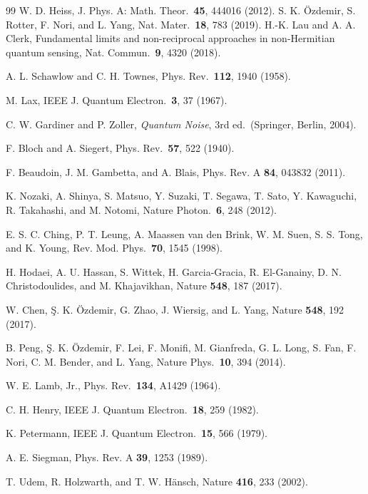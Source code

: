\documentclass[12pt]{article}
\begin{document}
\begin{thebibliography}{99}
W. D. Heiss,
J. Phys. A: Math. Theor.\ \textbf{45}, 444016 (2012).
S. K. \"{O}zdemir, S. Rotter, F. Nori, and L. Yang,
Nat. Mater.\ \textbf{18}, 783 (2019).
H.-K. Lau and A. A. Clerk,
Fundamental limits and non-reciprocal approaches in non-Hermitian quantum sensing,
Nat. Commun.\ \textbf{9}, 4320 (2018).


A. L. Schawlow and C. H. Townes,
Phys. Rev.\ \textbf{112}, 1940 (1958).

M. Lax,
IEEE J. Quantum Electron.\ \textbf{3}, 37 (1967).

C. W. Gardiner and P. Zoller,
\textit{Quantum Noise}, 3rd ed.\ (Springer, Berlin, 2004).

F. Bloch and A. Siegert,
Phys. Rev.\ \textbf{57}, 522 (1940).

F. Beaudoin, J. M. Gambetta, and A. Blais,
Phys. Rev. A \textbf{84}, 043832 (2011).

K. Nozaki, A. Shinya, S. Matsuo, Y. Suzaki, T. Segawa, T. Sato,
Y. Kawaguchi, R. Takahashi, and M. Notomi,
Nature Photon.\ \textbf{6}, 248 (2012).

E. S. C. Ching, P. T. Leung, A. Maassen van den Brink, W. M. Suen,
S. S. Tong, and K. Young,
Rev. Mod. Phys.\ \textbf{70}, 1545 (1998).

H. Hodaei, A. U. Hassan, S. Wittek, H. Garcia-Gracia, R. El-Ganainy,
D. N. Christodoulides, and M. Khajavikhan,
Nature \textbf{548}, 187 (2017).

W. Chen, \c{S}. K. \"{O}zdemir, G. Zhao, J. Wiersig, and L. Yang,
Nature \textbf{548}, 192 (2017).

B. Peng, \c{S}. K. \"{O}zdemir, F. Lei, F. Monifi, M. Gianfreda,
G. L. Long, S. Fan, F. Nori, C. M. Bender, and L. Yang,
Nature Phys.\ \textbf{10}, 394 (2014).

W. E. Lamb, Jr.,
Phys. Rev.\ \textbf{134}, A1429 (1964).

C. H. Henry,
IEEE J. Quantum Electron.\ \textbf{18}, 259 (1982).

K. Petermann,
IEEE J. Quantum Electron.\ \textbf{15}, 566 (1979).

A. E. Siegman,
Phys. Rev. A \textbf{39}, 1253 (1989).

T. Udem, R. Holzwarth, and T. W. H\"{a}nsch,
Nature \textbf{416}, 233 (2002).


\end{thebibliography}
\end{document}
